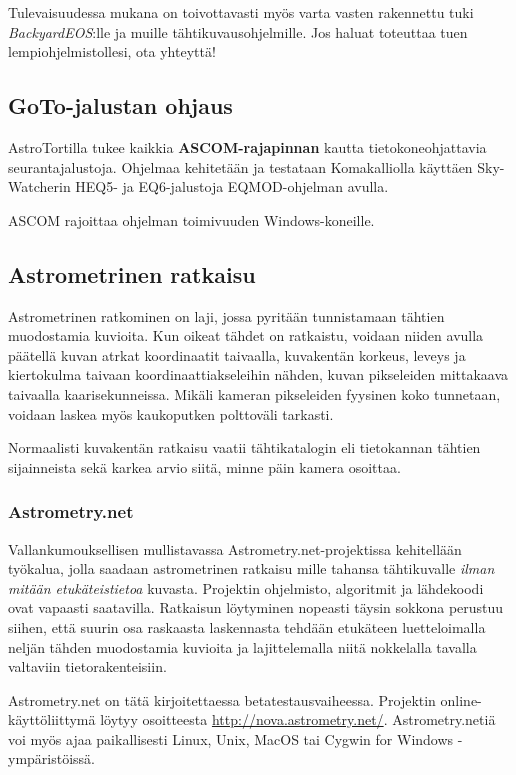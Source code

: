 \documentclass{article}
\newcommand{\surl}[1]{{\small \url{#1}}}
\begin{document}
Tulevaisuudessa mukana on toivottavasti myös varta vasten rakennettu tuki \emph{BackyardEOS}:lle ja muille tähtikuvausohjelmille. Jos haluat toteuttaa tuen lempiohjelmistollesi, ota yhteyttä!

\subsection{GoTo-jalustan ohjaus}

AstroTortilla tukee kaikkia \hbox{\textbf{ASCOM-rajapinnan}} kautta tietokoneohjattavia
seurantajalustoja. Ohjelmaa kehitetään ja testataan Komakalliolla käyttäen 
Sky-Watcherin HEQ5- ja EQ6-jalustoja EQMOD-ohjelman avulla.

ASCOM rajoittaa ohjelman toimivuuden Windows-koneille. 

\subsection{Astrometrinen ratkaisu}

Astrometrinen ratkominen on laji, jossa pyritään tunnistamaan tähtien muodostamia kuvioita.
Kun oikeat tähdet on ratkaistu, voidaan niiden avulla päätellä kuvan atrkat koordinaatit taivaalla,
kuvakentän korkeus, leveys ja kiertokulma taivaan koordinaattiakseleihin nähden, 
kuvan pikseleiden mittakaava taivaalla kaarisekunneissa. Mikäli kameran pikseleiden 
fyysinen koko tunnetaan, voidaan laskea myös kaukoputken polttoväli tarkasti.

Normaalisti kuvakentän ratkaisu vaatii tähtikatalogin eli tietokannan tähtien sijainneista sekä 
karkea arvio siitä, minne päin kamera osoittaa.

\subsubsection{Astrometry.net}

Vallankumouksellisen mullistavassa Astrometry.net-projektissa kehitellään
työkalua, jolla saadaan astrometrinen ratkaisu mille tahansa tähtikuvalle
\emph{ilman mitään etukäteistietoa} kuvasta. Projektin ohjelmisto, algoritmit 
ja lähdekoodi ovat vapaasti saatavilla. Ratkaisun löytyminen nopeasti täysin sokkona
perustuu siihen, että suurin osa raskaasta laskennasta tehdään etukäteen luetteloimalla
neljän tähden muodostamia kuvioita ja lajittelemalla niitä nokkelalla tavalla valtaviin
tietorakenteisiin.

Astrometry.net on tätä kirjoitettaessa betatestausvaiheessa. Projektin 
online-käyttöliittymä löytyy osoitteesta \surl {http://nova.astrometry.net/}.
Astrometry.netiä voi myös ajaa paikallisesti Linux, Unix, MacOS tai
Cygwin for Windows -ympäristöissä.
\end{document}

